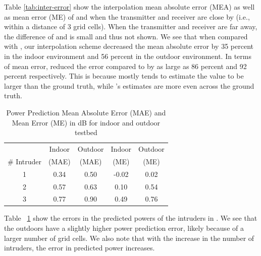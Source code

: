Table \ref{tab:inter-error} show the
interpolation mean absolute error (MEA) as well as mean error (ME) of
\idw and \ildw when the transmitter and receiver are close by (i.e.,
within a distance of 3 grid cells). When the transmitter and receiver
are far away, the difference of \idw and \ildw is small and thus not
shown.  We see that when compared with \idw, our \ildw interpolation
scheme decreased the mean absolute error by 35 percent in the indoor
environment and 56 percent in the outdoor environment.  In terms of
mean error, \ildw reduced the error compared to \idw by as large as 86
percent and 92 percent respectively. This is because \idw
mostly tends to estimate the value to be larger than the ground truth,
while \ildw's estimates are more even across the ground truth.

\begin{table}[ht]
	\caption{Power Prediction Mean Absolute Error (MAE) and Mean Error (ME) in dB for indoor and outdoor testbed}
	\centering
	\begin{tabular}{c | c c c c}
		\hline\hline
		& Indoor & Outdoor & Indoor  & Outdoor  \\
		\# Intruder  & (MAE)   &    (MAE)   &  (ME)  &   (ME)     \\
		\hline
		1 & 0.34 & 0.50 & -0.02 &  0.02 \\ 
		2 & 0.57 & 0.63  &  0.10 & 0.54\\
		3 & 0.77 & 0.90 & 0.49 & 0.76\\
		\hline %
	\end{tabular}
	\label{table:power-error}
\end{table}

  Table ~\ref{table:power-error} show the errors in the predicted powers of
the intruders in \ouralgo. We see that the outdoors have a slightly
higher power prediction error, likely because of a larger number of
grid cells. We also note that with the increase in the number of
intruders, the error in predicted power increases.





